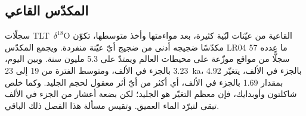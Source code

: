 \subsection*{المكدّس القاعي}

سجلّات \mbox{\textdir TLT $\delta^{18}$O} القاعية من عيّنات لبّية كثيرة، بعد مواءمتها وأخذ متوسطها، تكوّن مكدّسًا ضجيجه
أدنى من ضجيج أيّ عيّنة منفردة. ويجمع المكدّس LR04 ما عدده 57 سجلًّا من مواقع موزّعة على
محيطات العالم ويمتدّ على 5.3 مليون سنة. وبين اليوم، \num{3.23} بالجزء في الألف، ومتوسط الفترة من
\num{19} إلى \qty{23}{ka}، \num{4.92} بالجزء في الألف، يتغيّر بمقدار \num{1.69} بالجزء في الألف، أي أكثر من أيّ
أثر معقول لحجم الجليد. وكما خلص شاكلتون وأوبدايك، فإن معظم التغيّر هو الجليد؛
لكن بضعة أعشار من الجزء في الألف تبقى لتبرّد الماء العميق. وتقيس مسألة هذا الفصل ذلك الباقي.

